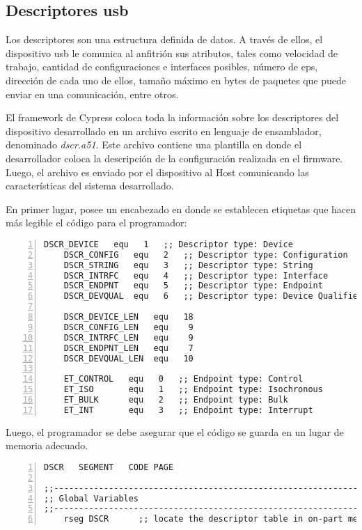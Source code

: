 \subsection{Descriptores \acrshort{usb}}	
	Los descriptores son una estructura definida de datos. A través de ellos, el dispositivo \acrshort{usb} le comunica al anfitrión sus atributos, tales como velocidad de trabajo, cantidad de configuraciones e interfaces posibles, número de \acrshort{ep}s, dirección de cada uno de ellos, tamaño máximo en bytes de paquetes que puede enviar en una comunicación, entre otros.%
	
	El framework de Cypress coloca toda la información sobre los descriptores del dispositivo desarrollado en un archivo escrito en lenguaje de ensamblador, denominado {\it dscr.a51}. Este archivo contiene una plantilla en donde el desarrollador coloca la descripción de la configuración realizada en el firmware. Luego, el archivo es enviado por el dispositivo al Host comunicando las características del sistema desarrollado.%
	
	En primer lugar, posee un encabezado en donde se establecen etiquetas que hacen más legible el código para el programador:
	\begin{lstlisting}[language={[x86masm]Assembler},backgroundcolor=\color{gray!30},numbers=left]
	DSCR_DEVICE   equ   1   ;; Descriptor type: Device
	DSCR_CONFIG   equ   2   ;; Descriptor type: Configuration
	DSCR_STRING   equ   3   ;; Descriptor type: String
	DSCR_INTRFC   equ   4   ;; Descriptor type: Interface
	DSCR_ENDPNT   equ   5   ;; Descriptor type: Endpoint
	DSCR_DEVQUAL  equ   6   ;; Descriptor type: Device Qualifier
	
	DSCR_DEVICE_LEN   equ   18
	DSCR_CONFIG_LEN   equ    9
	DSCR_INTRFC_LEN   equ    9
	DSCR_ENDPNT_LEN   equ    7
	DSCR_DEVQUAL_LEN  equ   10
	
	ET_CONTROL   equ   0   ;; Endpoint type: Control
	ET_ISO       equ   1   ;; Endpoint type: Isochronous
	ET_BULK      equ   2   ;; Endpoint type: Bulk
	ET_INT       equ   3   ;; Endpoint type: Interrupt
	\end{lstlisting}

	Luego, el programador se debe asegurar que el código se guarda en un lugar de memoria adecuado.
	
	\begin{lstlisting}[language={[x86masm]Assembler},backgroundcolor=\color{gray!30},numbers=left]
DSCR   SEGMENT   CODE PAGE

;;-----------------------------------------------------------------------------
;; Global Variables
;;-----------------------------------------------------------------------------
	rseg DSCR      ;; locate the descriptor table in on-part memory.
	\end{lstlisting}
	
